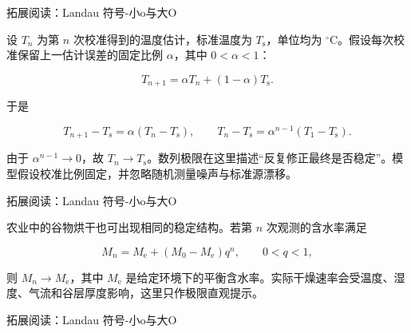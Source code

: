 \documentclass[aspectratio=169,10pt,fontset=fandol]{ctexbeamer}
\begin{document}
\begin{frame}[t,fragile]{拓展阅读：Landau 符号-小o与大O}
\normalsize
{\normalsize
\begin{application}[工程：温度传感器的迭代校准]

设 $T_n$ 为第 $n$ 次校准得到的温度估计，标准温度为 $T_{\mathrm s}$，单位均为 $^\circ\mathrm C$。假设每次校准保留上一估计误差的固定比例 $\alpha$，其中 $0<\alpha<1$：

\[

T_{n+1}=\alpha T_n+(1-\alpha)T_{\mathrm s}.

\]

于是

\[

T_{n+1}-T_{\mathrm s}=\alpha(T_n-T_{\mathrm s}),

\qquad

T_n-T_{\mathrm s}=\alpha^{n-1}(T_1-T_{\mathrm s}).

\]

由于 $\alpha^{n-1}\to0$，故 $T_n\to T_{\mathrm s}$。数列极限在这里描述“反复修正最终是否稳定”。模型假设校准比例固定，并忽略随机测量噪声与标准源漂移。

\end{application}
}
\end{frame}
\begin{frame}[t,fragile]{拓展阅读：Landau 符号-小o与大O}
\normalsize
{\normalsize
农业中的谷物烘干也可出现相同的稳定结构。若第 $n$ 次观测的含水率满足

\[

M_n=M_{\mathrm e}+(M_0-M_{\mathrm e})q^n,\qquad0<q<1,

\]

则 $M_n\to M_{\mathrm e}$，其中 $M_{\mathrm e}$ 是给定环境下的平衡含水率。实际干燥速率会受温度、湿度、气流和谷层厚度影响，这里只作极限直观提示。


}
\end{frame}
\begin{frame}[t,fragile]{拓展阅读：Landau 符号-小o与大O}
\normalsize
{\normalsize


\fi






}
\end{frame}
\end{document}
